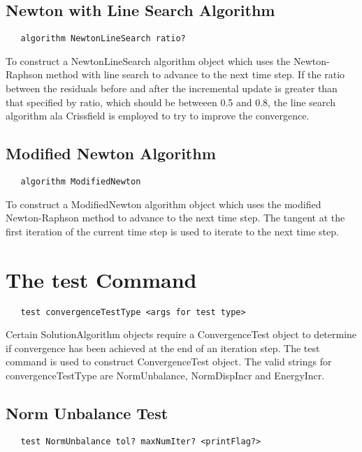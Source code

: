 \documentclass[12pt]{article}
\begin{document}
\subsection {Newton with Line Search Algorithm}
{\sf\small
\begin{verbatim}
   algorithm NewtonLineSearch ratio?
\end{verbatim}
}

To construct a NewtonLineSearch algorithm object which uses the Newton-Raphson
method with line search to advance to the next time step. If the
ratio between the residuals before and after the incremental update
is greater than that specified by ratio, which should be betweeen 0.5
and 0.8, the line search algorithm ala Crissfield is employed to try
to improve the convergence. 

\subsection {Modified Newton Algorithm}
{\sf\small
\begin{verbatim}
   algorithm ModifiedNewton
\end{verbatim}
}

To construct a ModifiedNewton algorithm object which uses the modified Newton-Raphson
method to advance to the next time step. The tangent at the first iteration of the current
time step is used to iterate to the next time step.

\section {The test Command}

{\sf\small
\begin{verbatim}
   test convergenceTestType <args for test type>
\end{verbatim}
}

Certain SolutionAlgorithm objects require a ConvergenceTest object to
determine if convergence has been achieved at the end of an iteration
step. The test command is used to construct ConvergenceTest object. The
valid strings for convergenceTestType are NormUnbalance, NormDispIncr
and EnergyIncr.

\subsection{Norm Unbalance Test}

{\sf\small
\begin{verbatim}
   test NormUnbalance tol? maxNumIter? <printFlag?>
\end{verbatim}
}
\end{document}
